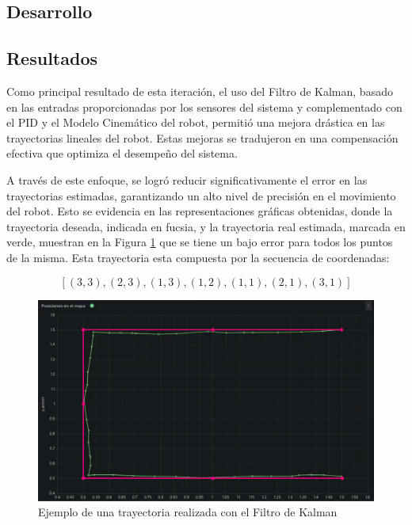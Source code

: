 \subsection{Desarrollo}







\subsection{Resultados}

Como principal resultado de esta iteración, el uso del Filtro de Kalman, basado en las entradas proporcionadas por los sensores del sistema y complementado con el PID y el Modelo Cinemático del robot, permitió una mejora drástica en las trayectorias lineales del robot. Estas mejoras se tradujeron en una compensación efectiva que optimiza el desempeño del sistema.

A través de este enfoque, se logró reducir significativamente el error en las trayectorias estimadas, garantizando un alto nivel de precisión en el movimiento del robot. Esto se evidencia en las representaciones gráficas obtenidas, donde la trayectoria deseada, indicada en fucsia, y la trayectoria real estimada, marcada en verde, muestran en la Figura \ref{fig:ejemplofiltrokalman} que se tiene un bajo error para todos los puntos de la misma. Esta trayectoria esta compuesta por la secuencia de coordenadas:

$$ [(3,3), (2,3), (1,3), (1,2), (1,1), (2,1), (3,1)] $$

\begin{figure}[H]
    \centering
    \includegraphics[width=1\linewidth]{images/ejemplo_trayectoria_compensacion_kalman.png}
    \caption{Ejemplo de una trayectoria realizada con el Filtro de Kalman}
    \label{fig:ejemplofiltrokalman}
\end{figure}

